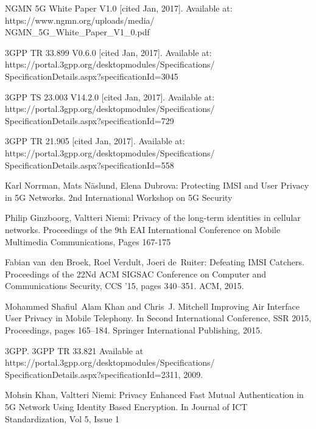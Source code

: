 \documentclass[conference]{IEEEtran}
\begin{document}
\begin{thebibliography}{6}

 NGMN 5G White Paper V1.0 [cited Jan, 2017]. Available at: https://www.ngmn.org/uploads/media/\\NGMN\_5G\_White\_Paper\_V1\_0.pdf

 3GPP TR 33.899 V0.6.0 [cited Jan, 2017]. Available at: https://portal.3gpp.org/desktopmodules/Specifications/\\SpecificationDetails.aspx?specificationId=3045

 3GPP TS 23.003 V14.2.0 [cited Jan, 2017]. Available at: https://portal.3gpp.org/desktopmodules/Specifications/\\SpecificationDetails.aspx?specificationId=729

 3GPP TR 21.905 [cited Jan, 2017]. Available at: https://portal.3gpp.org/desktopmodules/Specifications/\\SpecificationDetails.aspx?specificationId=558


 Karl Norrman, Mats N\"aslund, Elena Dubrova: Protecting IMSI and User Privacy in 5G Networks. 2nd International Workshop on 5G Security

 Philip Ginzboorg,  Valtteri Niemi: Privacy of the long-term identities in cellular networks. Proceedings of the 9th EAI International Conference on Mobile Multimedia Communications, Pages 167-175

 Fabian van~den Broek, Roel Verdult, Joeri de~Ruiter: Defeating IMSI Catchers. Proceedings of the 22Nd ACM SIGSAC Conference on Computer and Communications Security, CCS '15, pages 340--351. ACM, 2015.


 Mohammed Shafiul~Alam Khan and Chris~J. Mitchell Improving Air Interface User Privacy in Mobile Telephony. In Second International Conference, SSR 2015, Proceedings, pages 165--184. Springer International Publishing, 2015.


 3GPP. 3GPP TR 33.821 Available at https://portal.3gpp.org/desktopmodules/Specifications/\\SpecificationDetails.aspx?specificationId=2311, 2009.

 Mohsin Khan, Valtteri Niemi: Privacy Enhanced Fast Mutual Authentication in 5G Network Using
Identity Based Encryption. In Journal of ICT Standardization, Vol 5, Issue 1


\end{thebibliography}
\end{document}
